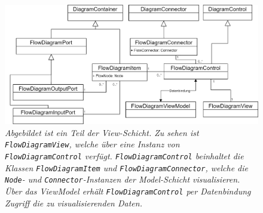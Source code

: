 \begin{figure} %
	\centering
		\includegraphics[width=\textwidth]{img/FlowViewUML.png}
	\caption[Klassenstruktur der View-Schicht]{\textit{Abgebildet ist ein Teil der View-Schicht. Zu sehen ist \texttt{FlowDiagramView}, welche über eine Instanz von \texttt{FlowDiagramControl} verfügt. \texttt{FlowDiagramControl} beinhaltet die Klassen \texttt{FlowDiagramItem} und \texttt{FlowDiagramConnector}, welche die \texttt{Node}- und \texttt{Connector}-Instanzen der Model-Schicht visualisieren. Über das ViewModel erhält \texttt{FlowDiagramControl} per Datenbindung Zugriff die zu visualisierenden Daten.}}
	\label{fig:UML:FlowView}
\end{figure}
